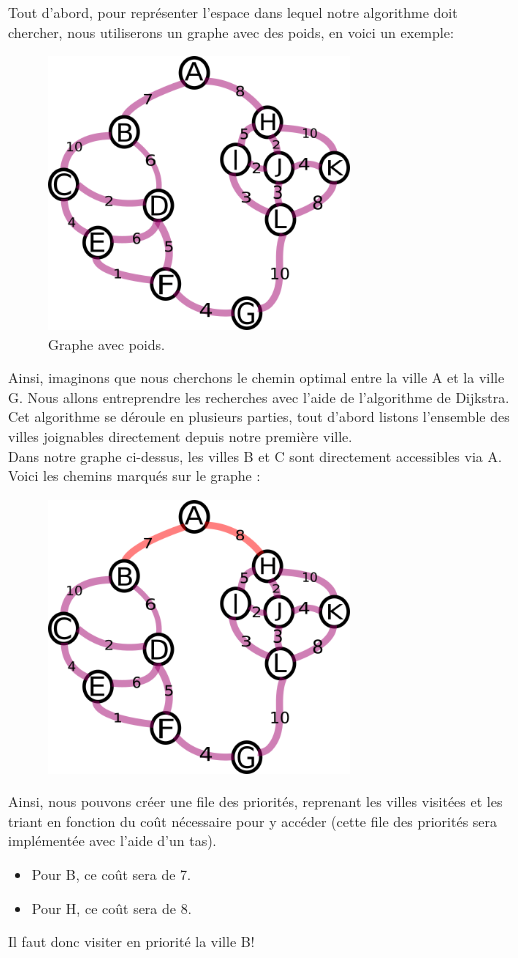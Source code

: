 \documentclass[a4paper, 12pt]{article}
\numberwithin{equation}{subsection}
\begin{document}
Tout d'abord, pour représenter l'espace dans lequel notre algorithme doit chercher, nous utiliserons un graphe avec des poids, en voici un exemple: \\
\begin{figure}[H]
  \centering
  \includegraphics[width=8.0cm]{imgs/numbered_graph.png}
  \caption{Graphe avec poids.}
\end{figure}
Ainsi, imaginons que nous cherchons le chemin optimal entre la ville A et la ville G. Nous allons entreprendre les recherches avec l'aide de l'algorithme de Dijkstra. \\

Cet algorithme se déroule en plusieurs parties, tout d'abord listons l'ensemble des villes joignables directement depuis notre première ville. \\

Dans notre graphe ci-dessus, les villes B et C sont directement accessibles via A.\\

Voici les chemins marqués sur le graphe : \\
\begin{figure}[H]
  \centering
  \includegraphics[width=8.0cm]{imgs/second_search.png}
\end{figure}
Ainsi, nous pouvons créer une file des priorités, reprenant les villes visitées et les triant en fonction du coût nécessaire pour y accéder (cette file des priorités sera implémentée avec l'aide d'un tas). \\
\begin{itemize}
  \item Pour B, ce coût sera de 7.
  \item Pour H, ce coût sera de 8.
\end{itemize}
Il faut donc visiter en priorité la ville B! \\
\end{document}
